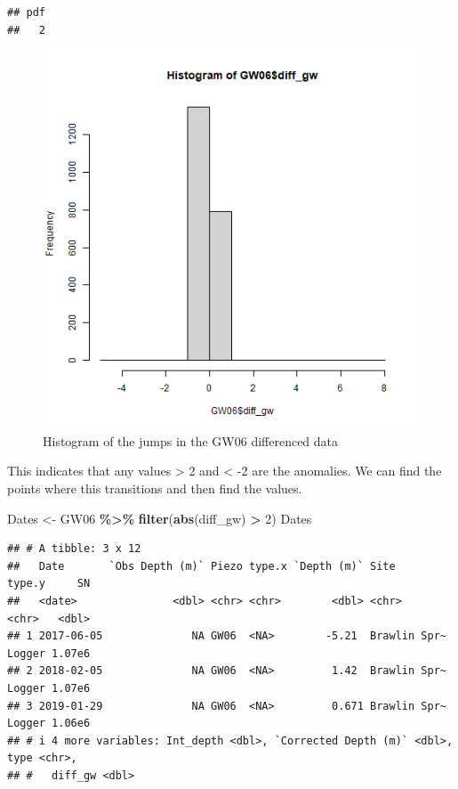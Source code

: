 \documentclass[
]{article}
\newenvironment{Shaded}{\begin{snugshade}}{\end{snugshade}}
\newcommand{\DecValTok}[1]{\textcolor[rgb]{0.00,0.00,0.81}{#1}}
\newcommand{\FunctionTok}[1]{\textcolor[rgb]{0.13,0.29,0.53}{\textbf{#1}}}
\newcommand{\NormalTok}[1]{#1}
\newcommand{\OtherTok}[1]{\textcolor[rgb]{0.56,0.35,0.01}{#1}}
\newcommand{\SpecialCharTok}[1]{\textcolor[rgb]{0.81,0.36,0.00}{\textbf{#1}}}
\begin{document}
\begin{verbatim}
## pdf 
##   2
\end{verbatim}

\begin{figure}
\includegraphics[width=0.8\linewidth]{../Figures/HistogramGW06_difference} \caption{Histogram of the jumps in the GW06 differenced data}\label{fig:hist-jumps-GW06}
\end{figure}

This indicates that any values \textgreater{} 2 and \textless{} -2 are
the anomalies. We can find the points where this transitions and then
find the values.

\begin{Shaded}
\begin{Highlighting}[]
\NormalTok{Dates }\OtherTok{\textless{}{-}}\NormalTok{ GW06 }\SpecialCharTok{\%\textgreater{}\%}
  \FunctionTok{filter}\NormalTok{(}\FunctionTok{abs}\NormalTok{(diff\_gw) }\SpecialCharTok{\textgreater{}} \DecValTok{2}\NormalTok{)}
\NormalTok{Dates}
\end{Highlighting}
\end{Shaded}

\begin{verbatim}
## # A tibble: 3 x 12
##   Date       `Obs Depth (m)` Piezo type.x `Depth (m)` Site         type.y     SN
##   <date>               <dbl> <chr> <chr>        <dbl> <chr>        <chr>   <dbl>
## 1 2017-06-05              NA GW06  <NA>        -5.21  Brawlin Spr~ Logger 1.07e6
## 2 2018-02-05              NA GW06  <NA>         1.42  Brawlin Spr~ Logger 1.07e6
## 3 2019-01-29              NA GW06  <NA>         0.671 Brawlin Spr~ Logger 1.06e6
## # i 4 more variables: Int_depth <dbl>, `Corrected Depth (m)` <dbl>, type <chr>,
## #   diff_gw <dbl>
\end{verbatim}
\end{document}
